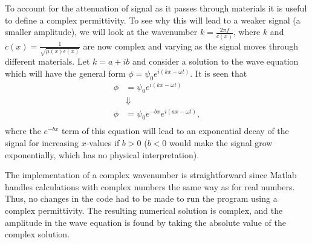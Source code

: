 \documentclass[10pt,a4paper]{article}
\begin{document}
To account for the attenuation of signal as it passes through materials it is useful to define a complex permittivity. To see why this will lead to a weaker signal (a smaller amplitude), we will look at the wavenumber $k = \frac{2 \pi f}{c(x)}$, where $k$ and $c(x) = \frac{1}{\sqrt{\mu (x) \epsilon (x)}}$ are now complex and varying as the signal moves through different materials. Let $k = a + ib$ and consider a solution to the wave equation which will have the general form $\phi = \psi_0 e^{i(kx- \omega t)}$. It is seen that 
\begin{align*}
\phi &= \psi_0 e^{i(kx- \omega t)} \\
 &\Downarrow \\
 \phi &= \psi_0 e^{-bx} e^{i(ax- \omega t)}, \\
\end{align*}
where the $e^{-bx}$ term of this equation will lead to an exponential decay of the signal for increasing $x$-values if $b>0$ ($b<0$ would make the signal grow exponentially, which has no physical interpretation).

The implementation of a complex wavenumber is straightforward since Matlab handles calculations with complex numbers the same way as for real numbers. Thus, no changes in the code had to be made to run the program using a complex permittivity. The resulting numerical solution is complex, and the amplitude in the wave equation is found by taking the absolute value of the complex solution.
\end{document}
